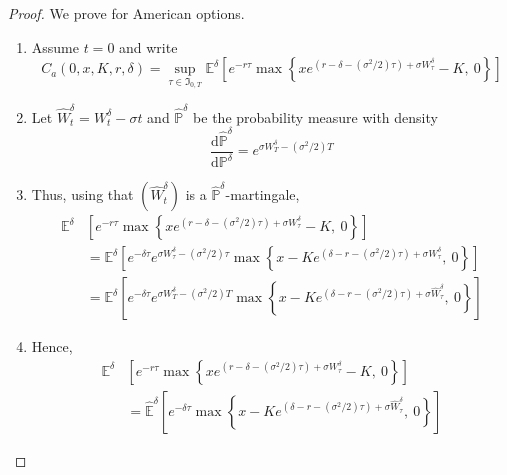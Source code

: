 \begin{proof} 
    We prove for American options.
    \begin{enumerate}
        \item Assume $t = 0$ and write \[ C_a(0, x, K, r, \delta) = \sup_{\tau \in \mathfrak{I}_{0, T}} \mathbb{E}^\delta \left[ e^{-r\tau } \max \left\{xe^{(r-\delta-(\sigma^2/2)\tau) + \sigma W_\tau^\delta} - K, ~0 \right\} \right] \]
        \item Let $\hat{W}_t^\delta = W_t^\delta - \sigma t$ and $\hat{\mathbb{P}}^\delta$ be the probability measure with density \[ \frac{\mathrm{d}\hat{\mathbb{P}}^\delta}{\mathrm{d} \mathbb{P}^\delta} = e^{\sigma W_T^\delta - (\sigma^2/2)T} \]
        \item Thus, using that $(\hat{W}_t^\delta)$ is a $\hat{\mathbb{P}}^\delta$-martingale,
        \begin{equation*}
            \begin{aligned}
                \mathbb{E}^\delta & \left[ e^{-r\tau } \max \left\{xe^{(r-\delta-(\sigma^2/2)\tau) + \sigma W_\tau^\delta} - K, ~0 \right\} \right] \\
                &= \mathbb{E}^\delta \left[ e^{-\delta \tau} e^{\sigma W_\tau^\delta - (\sigma^2/2)\tau} \max \left\{ x - Ke^{(\delta - r - (\sigma^2/2)\tau) + \sigma W_\tau^\delta} ,~0 \right\}  \right] \\
                &= \mathbb{E}^\delta \left[ e^{-\delta \tau} e^{\sigma W_T^\delta - (\sigma^2/2)T} \max \left\{ x - Ke^{(\delta - r - (\sigma^2/2)\tau) + \sigma \hat{W}_\tau^\delta} ,~0 \right\}  \right]
            \end{aligned}
        \end{equation*}
        \item Hence,
        \begin{equation*}
            \begin{aligned}
                \mathbb{E}^\delta & \left[ e^{-r\tau } \max \left\{xe^{(r-\delta-(\sigma^2/2)\tau) + \sigma W_\tau^\delta} - K, ~0 \right\} \right] \\
                &= \hat{\mathbb{E}}^\delta \left[ e^{-\delta \tau } \max \left\{x - K e^{(\delta - r - (\sigma^2/2)\tau) + \sigma \hat{W}_\tau^\delta} , ~0 \right\} \right]
            \end{aligned}
        \end{equation*}
    \end{enumerate}
\end{proof}